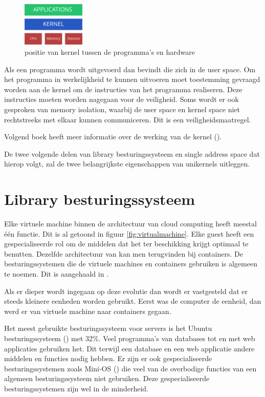 \documentclass[pdftex,a4paper,12pt,twoside]{report}
\begin{document}
\begin{figure}
    \centering
    \includegraphics[width=3cm]{img/kernel}
    \caption{positie van kernel tussen de programma's en hardware}
    \label{fig:kernel}
\end{figure}

Als een programma wordt uitgevoerd dan bevindt die zich in de user space. Om het programma in werkelijkheid te kunnen uitvoeren moet toestemming gevraagd worden aan de kernel om de instructies van het programma realiseren. Deze instructies moeten worden nagegaan voor de veiligheid. Soms wordt er ook gesproken van memory isolation, waarbij de user space en kernel space niet rechtstreeks met elkaar kunnen communiceren. Dit is een veiligheidsmaatregel.

Volgend boek heeft meer informatie over de werking van de kernel (\cite{bovet_understanding_2005}).

De twee volgende delen van library besturingssysteem en single address space dat hierop volgt, zal de twee belangrijkste eigenschappen van unikernels uitleggen.

\section{Library besturingssysteem}

Elke virtuele machine binnen de architectuur van cloud computing heeft meestal één functie. Dit is al getoond in figuur \ref{fig:virtualmachine}. Elke guest heeft een gespecialiseerde rol om de middelen dat het ter beschikking krijgt optimaal te benutten.
Dezelfde architectuur van kan men terugvinden bij containers. De besturingssystemen die de virtuele machines en containers gebruiken is algemeen te noemen. Dit is aangehaald in \cite{madhavapeddy_unikernels_2013}.

Als er dieper wordt ingegaan op deze evolutie dan wordt er vastgesteld dat er steeds kleinere eenheden worden gebruikt. Eerst was de computer de eenheid, dan werd er van virtuele machine naar containers gegaan.

Het meest gebruikte besturingssysteem voor servers is het Ubuntu besturingssysteem (\cite{matthias_gelbmann_ubuntu_2016}) met 32\%. Veel programma's van databases tot en met web applicaties gebruiken het. Dit terwijl een database en een web applicatie andere middelen en functies nodig hebben.
Er zijn er ook gespecialiseerde besturingssystemen zoals Mini-OS (\cite{satya_popuri_tour_????}) die veel van de overbodige functies van een algemeen besturingssysteem niet gebruiken. Deze gespecialiseerde besturingssystemen zijn wel in de minderheid.
\end{document}
